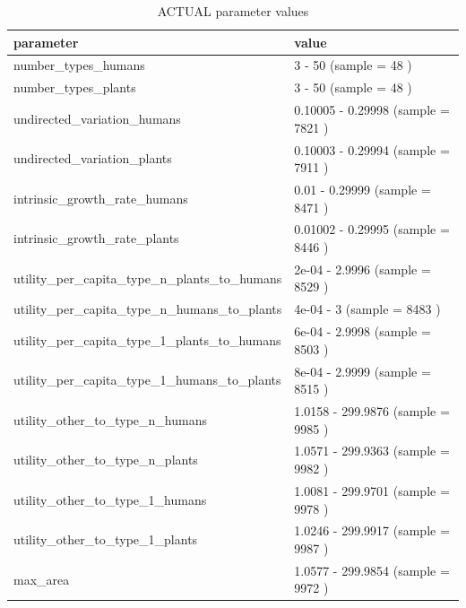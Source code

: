 \documentclass[
]{book}
\begin{document}
\begin{table}[!h]

\caption{\label{tab:5LHStablepdf}ACTUAL parameter values}
\centering
\begin{tabular}[t]{l|l}
\hline
parameter & value\\
\hline
number\_types\_humans & 3 - 50 (sample = 48 )\\
\hline
number\_types\_plants & 3 - 50 (sample = 48 )\\
\hline
undirected\_variation\_humans & 0.10005 - 0.29998 (sample = 7821 )\\
\hline
undirected\_variation\_plants & 0.10003 - 0.29994 (sample = 7911 )\\
\hline
intrinsic\_growth\_rate\_humans & 0.01 - 0.29999 (sample = 8471 )\\
\hline
intrinsic\_growth\_rate\_plants & 0.01002 - 0.29995 (sample = 8446 )\\
\hline
utility\_per\_capita\_type\_n\_plants\_to\_humans & 2e-04 - 2.9996 (sample = 8529 )\\
\hline
utility\_per\_capita\_type\_n\_humans\_to\_plants & 4e-04 - 3 (sample = 8483 )\\
\hline
utility\_per\_capita\_type\_1\_plants\_to\_humans & 6e-04 - 2.9998 (sample = 8503 )\\
\hline
utility\_per\_capita\_type\_1\_humans\_to\_plants & 8e-04 - 2.9999 (sample = 8515 )\\
\hline
utility\_other\_to\_type\_n\_humans & 1.0158 - 299.9876 (sample = 9985 )\\
\hline
utility\_other\_to\_type\_n\_plants & 1.0571 - 299.9363 (sample = 9982 )\\
\hline
utility\_other\_to\_type\_1\_humans & 1.0081 - 299.9701 (sample = 9978 )\\
\hline
utility\_other\_to\_type\_1\_plants & 1.0246 - 299.9917 (sample = 9987 )\\
\hline
max\_area & 1.0577 - 299.9854 (sample = 9972 )\\
\hline
\end{tabular}
\end{table}

\newpage
\end{document}
